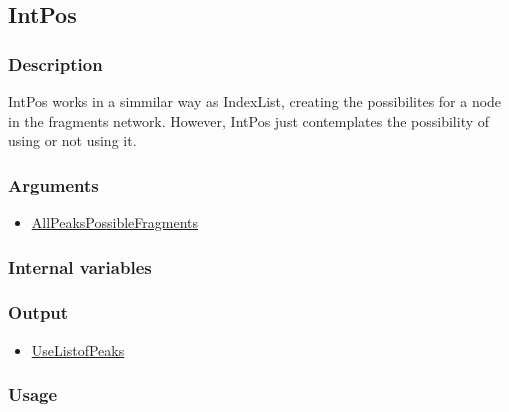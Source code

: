 \subsection{IntPos}\label{IntPos}
\subsubsection{Description}
IntPos works in a simmilar way as IndexList, creating the possibilites for a node in the fragments network. However, IntPos just contemplates the possibility of using or not using it.
\subsubsection{Arguments}
\begin{itemize}
\item \hyperref[AllPeaksPossibleFragments]{AllPeaksPossibleFragments}
\end{itemize}
\subsubsection{Internal variables}
\subsubsection{Output}
\begin{itemize}
\item \hyperref[UseListofPeaks]{UseListofPeaks}
\end{itemize}
\subsubsection{Usage}
